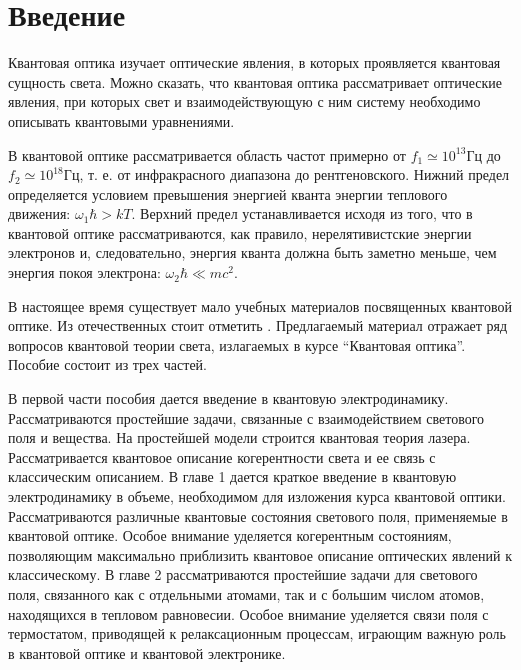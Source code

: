 \chapter*{Введение}

Квантовая оптика изучает оптические явления, в которых проявляется
квантовая сущность света. Можно сказать, что квантовая оптика
рассматривает оптические явления, при которых свет и взаимодействующую
с ним систему необходимо описывать квантовыми уравнениями. 

В квантовой оптике рассматривается область частот примерно от 
\(f_1 \simeq 10^{13} \mbox{Гц}\) до \(f_2 \simeq 10^{18}
\mbox{Гц}\), т. е. от инфракрасного диапазона до
рентгеновского. Нижний предел определяется условием превышения
энергией кванта энергии теплового движения: 
\(\omega_1 \hbar > k T\). Верхний предел
устанавливается исходя из того, что в квантовой оптике
рассматриваются, как правило, нерелятивистские энергии электронов и,
следовательно, энергия кванта должна быть заметно меньше, чем энергия
покоя электрона: \(\omega_2 \hbar \ll m c^2\).

В настоящее время существует мало учебных материалов посвященных
квантовой оптике. Из отечественных стоит отметить 
\cite{bTarasovQuantumOpticsIntro2008}.  Предлагаемый материал отражает
ряд вопросов квантовой теории света, излагаемых в курсе ``Квантовая
оптика''. Пособие состоит из трех частей. 

В первой части пособия дается введение в квантовую
электродинамику. Рассматриваются простейшие задачи, связанные с
взаимодействием светового поля и вещества. На простейшей модели
строится квантовая теория лазера. Рассматривается квантовое описание
когерентности света и ее связь с классическим описанием. 
В главе 1 дается краткое введение в квантовую
электродинамику в объеме, необходимом для изложения курса квантовой
оптики. Рассматриваются различные квантовые состояния светового поля,
применяемые в квантовой оптике. Особое внимание уделяется когерентным
состояниям, позволяющим максимально приблизить квантовое описание
оптических явлений к классическому. 
В главе 2  рассматриваются простейшие задачи для светового поля,
связанного как с отдельными атомами, так и с большим числом атомов,
находящихся в тепловом равновесии. Особое внимание уделяется
связи поля с термостатом, приводящей к релаксационным процессам,
играющим важную роль в квантовой оптике и квантовой
электронике.

